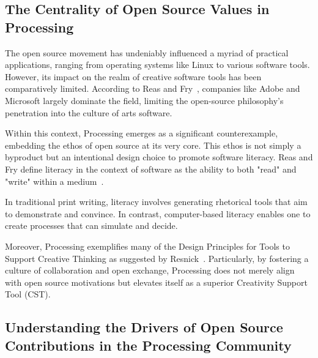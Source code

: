 \subsection{The Centrality of Open Source Values in Processing}

The open source movement has undeniably influenced a myriad of practical applications, ranging from operating systems like Linux to various software tools. However, its impact on the realm of creative software tools has been comparatively limited. According to Reas and Fry~\parencite[30]{reasProcessingProgrammingHandbook2007}, companies like Adobe and Microsoft largely dominate the field, limiting the open-source philosophy's penetration into the culture of arts software. %

Within this context, Processing emerges as a significant counterexample, embedding the ethos of open source at its very core. This ethos is not simply a byproduct but an intentional design choice to promote software literacy. Reas and Fry define literacy in the context of software as the ability to both "read" and "write" within a medium~\parencite[29]{reasProcessingProgrammingHandbook2007}. %

In traditional print writing, literacy involves generating rhetorical tools that aim to demonstrate and convince. In contrast, computer-based literacy enables one to create processes that can simulate and decide. %

Moreover, Processing exemplifies many of the Design Principles for Tools to Support Creative Thinking as suggested by Resnick~\parencite{resnickDesignPrinciplesTools}. Particularly, by fostering a culture of collaboration and open exchange, Processing does not merely align with open source motivations but elevates itself as a superior Creativity Support Tool (CST). %




\subsection{Understanding the Drivers of Open Source Contributions in the Processing Community}

